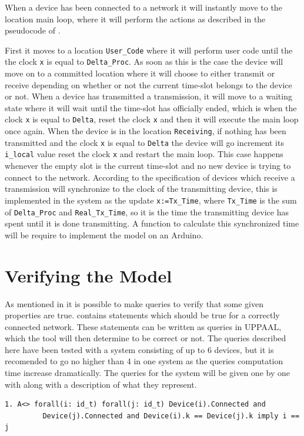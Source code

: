 When a device has been connected to a network it will instantly move to the location main loop, where it will perform the actions as described in the pseudocode of .

First it moves to a location \texttt{User\_Code} where it will perform user code until the the clock \texttt{x} is equal to \texttt{Delta\_Proc}.
As soon as this is the case the device will move on to a committed location where it will choose to either transmit or receive depending on whether or not the current time-slot belongs to the device or not.
When a device has transmitted a transmission, it will move to a waiting state where it will wait until the time-slot has officially ended, which is when the clock \texttt{x} is equal to \texttt{Delta}, reset the clock \texttt{x} and then it will execute the main loop once again.
When the device is in the location \texttt{Receiving}, if nothing has been transmitted and the clock \texttt{x} is equal to \texttt{Delta} the device will go increment its \texttt{i\_local} value reset the clock \texttt{x} and restart the main loop. 
This case happens whenever the empty slot is the current time-slot and no new device is trying to connect to the network.
According to the specification of  devices which receive a transmission will synchronize to the clock of the transmitting device, this is implemented in the system as the update \texttt{x:=Tx\_Time}, where \texttt{Tx\_Time} is the sum of \texttt{Delta\_Proc} and \texttt{Real\_Tx\_Time}, so it is the time the transmitting device has spent until it is done transmitting.
A function to calculate this synchronized time will be require to implement the model on an Arduino.

\section{Verifying the Model}

As mentioned in  it is possible to make queries to verify that some given properties are true.
 contains statements which should be true for a correctly connected network.
These statements can be written as queries in UPPAAL, which the tool will then determine to be correct or not. 
The queries described here have been tested with a system consisting of up to 6 devices, but it is recomended to go no higher than 4 in one system as the queries computation time increase dramatically.
The queries for the system will be given one by one with along with a description of what they represent.
\begin{lstlisting}[style=UPPAAL, title={This means that eventually it will be true that all devices are connected, and if two devices have the same time-slot \texttt{k} for as their own, it means it is the same device. }]
1. A<> forall(i: id_t) forall(j: id_t) Device(i).Connected and
		 Device(j).Connected and Device(i).k == Device(j).k imply i == j
\end{lstlisting}

